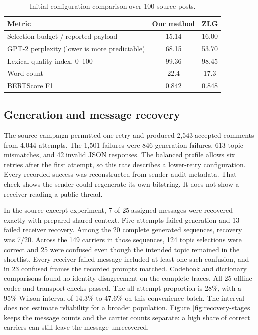 \documentclass[3p,times,procedia]{elsarticle}
\begin{document}
\begin{table}[t]
\centering
\caption{Initial configuration comparison over 100 source posts.}
\label{tab:initial}
\begin{tabular}{lcc}
\toprule
Metric & Our method & ZLG \\
\midrule
Selection budget / reported payload & 15.14 & 16.00 \\
GPT-2 perplexity (lower is more predictable) & 68.15 & 53.70 \\
Lexical quality index, 0--100 & 99.36 & 98.45 \\
Word count & 22.4 & 17.3 \\
BERTScore F1 & 0.842 & 0.848 \\
\bottomrule
\end{tabular}
\end{table}

\subsection{Generation and message recovery}

The source campaign permitted one retry and produced 2,543 accepted comments from 4,044 attempts. The 1,501 failures were 846 generation failures, 613 topic mismatches, and 42 invalid JSON responses. The balanced profile allows six retries after the first attempt, so this rate describes a lower-retry configuration. Every recorded success was reconstructed from sender audit metadata. That check shows the sender could regenerate its own bitstring. It does not show a receiver reading a public thread.

In the source-excerpt experiment, 7 of 25 assigned messages were recovered exactly with prepared shared context. Five attempts failed generation and 13 failed receiver recovery. Among the 20 complete generated sequences, recovery was 7/20. Across the 149 carriers in those sequences, 124 topic selections were correct and 25 were confused even though the intended topic remained in the shortlist. Every receiver-failed message included at least one such confusion, and in 23 confused frames the recorded prompts matched. Codebook and dictionary comparisons found no identity disagreement on the complete traces. All 25 offline codec and transport checks passed. The all-attempt proportion is 28\%, with a 95\% Wilson interval of 14.3\% to 47.6\% on this convenience batch. The interval does not estimate reliability for a broader population. Figure~\ref{fig:recovery-stages} keeps the message counts and the carrier counts separate: a high share of correct carriers can still leave the message unrecovered.
\end{document}
